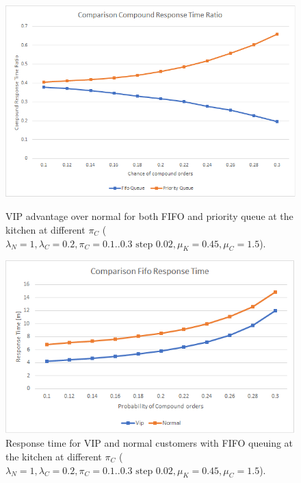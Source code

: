 \begin{figure}[h!]
    \centering
    \begin{minipage}{0.48\textwidth}
      \includegraphics[width=\textwidth]{figs/comparisonQueue.png}
      \caption{VIP advantage over normal for both FIFO and priority queue at the kitchen at different $\pi_C$ ($\lambda_N=1,\lambda_C=0.2,\pi_C={{0.1..0.3 \text{ step } 0.02}}, \mu_K=0.45, \mu_C=1.5$).}
      \label{fig:comp_kitc}
    \end{minipage}\hspace{0.03\textwidth}
    \begin{minipage}{0.48\textwidth}
      \includegraphics[width=\textwidth]{figs/comparisonFifoKitchen.png}
      \caption{Response time for VIP and normal customers with FIFO queuing at the kitchen at different $\pi_C$ ($\lambda_N=1,\lambda_C=0.2,\pi_C={{0.1..0.3 \text{ step } 0.02}}, \mu_K=0.45, \mu_C=1.5$).}
      \label{fig:fifokitchen-constant}
    \end{minipage}
\end{figure}

